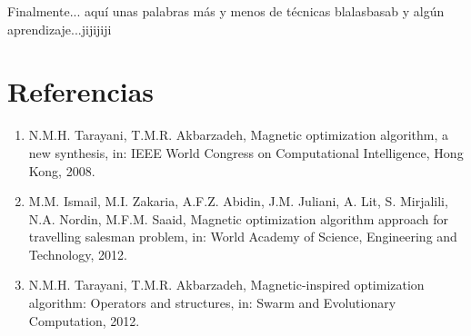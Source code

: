 \documentclass[12pt]{article}
\begin{document}
Finalmente... aquí unas palabras más y menos de técnicas blalasbasab
y algún aprendizaje...jijijiji


\newpage

\section{Referencias}\label{sec:ref}


\begin{enumerate}
\item N.M.H. Tarayani, T.M.R. Akbarzadeh, Magnetic optimization algorithm, a new synthesis, in: IEEE World Congress on Computational Intelligence, Hong Kong, 2008.

\item M.M. Ismail, M.I. Zakaria, A.F.Z. Abidin, J.M. Juliani, A. Lit, S. Mirjalili, N.A. Nordin, M.F.M. Saaid, Magnetic optimization algorithm approach for travelling salesman problem, in: World Academy of Science, Engineering and Technology, 2012.

\item N.M.H. Tarayani, T.M.R. Akbarzadeh, Magnetic-inspired optimization algorithm: Operators and structures, in: Swarm and Evolutionary Computation, 2012.

\end{enumerate}
\end{document}

